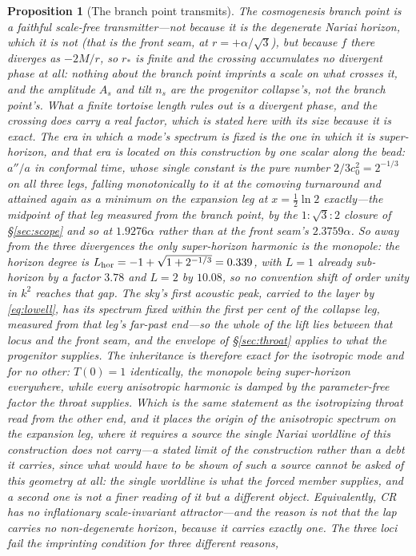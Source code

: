 \documentclass[11pt,a4paper]{article}
\theoremstyle{plain}
\newtheorem{proposition}{Proposition}
\theoremstyle{definition}
\theoremstyle{remark}
\begin{document}
\begin{proposition}[The branch point transmits]\label{prop:transmit}
The cosmogenesis branch point is a faithful scale-free transmitter---not because it \emph{is} the degenerate Nariai horizon, which it is not (that is the front seam, at $r=+\alpha/\sqrt3$), but because $f$ there \emph{diverges} as $-2M/r$, so $r_{*}$ is finite and the crossing accumulates no divergent phase at all: nothing about the branch point imprints a scale on what crosses it, and the amplitude $A_s$ and tilt $n_s$ are the progenitor collapse's, not the branch point's. \emph{What a finite tortoise length rules out is a divergent phase, and the crossing does carry a real factor, which is stated here with its size because it is exact.} \emph{The era in which a mode's spectrum is fixed is the one in which it is super-horizon}, and that era is located on this construction by one scalar along the bead: $a''/a$ in conformal time, whose single constant is the pure number $2/3c_0^{2}=2^{-1/3}$ on all three legs, falling monotonically to it at the comoving turnaround and attained again as a \emph{minimum} on the expansion leg at $x=\tfrac12\ln2$ exactly---the midpoint of that leg measured from the branch point, by the $1:\sqrt3:2$ closure of \S\ref{sec:scope} and so at $1.9276\alpha$ rather than at the front seam's $2.3759\alpha$. \emph{So away from the three divergences the only super-horizon harmonic is the monopole}: the horizon degree is $L_{\rm hor}=-1+\sqrt{1+2^{-1/3}}=0.339$, with $L=1$ already sub-horizon by a factor $3.78$ and $L=2$ by $10.08$, so no convention shift of order unity in $k^2$ reaches that gap. \emph{The sky's first acoustic peak, carried to the layer by \eqref{eq:lowell}, has its spectrum fixed within the first per cent of the collapse leg, measured from that leg's far-past end}---so the whole of the lift lies between that locus and the front seam, and the envelope of \S\ref{sec:throat} applies to what the progenitor supplies. \emph{The inheritance is therefore exact for the isotropic mode and for no other}: $T(0)=1$ identically, the monopole being super-horizon everywhere, while every anisotropic harmonic is damped by the parameter-free factor the throat supplies. \emph{Which is the same statement as the isotropizing throat read from the other end}, and it places the origin of the anisotropic spectrum on the expansion leg, where it requires a source the single Nariai worldline of this construction does not carry---\emph{a stated limit of the construction rather than a debt it carries}, since what would have to be shown of such a source cannot be asked of this geometry at all: the single worldline is what the forced member supplies, and a second one is not a finer reading of it but a different object. \emph{Equivalently, CR has no inflationary scale-invariant attractor---and the reason is not that the lap carries no non-degenerate horizon, because it carries exactly one.} The three loci fail the imprinting condition for three different reasons, 
\end{proposition}
\end{document}
